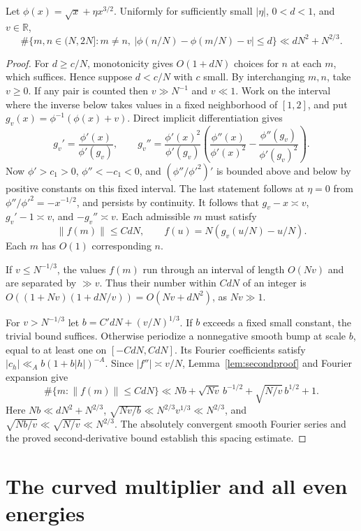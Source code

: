 \begin{lemma}\label{lem:spacingproof}
Let $\phi(x)=\sqrt x+\eta x^{3/2}$. Uniformly for sufficiently small
$|\eta|$, $0<d<1$, and $v\in\mathbb R$,
\[
 \#\{m,n\in(N,2N]:m\ne n,\ |\phi(n/N)-\phi(m/N)-v|\le d\}
 \ll dN^2+N^{2/3}.
\]
\end{lemma}
\begin{proof}
For $d\ge c/N$, monotonicity gives $O(1+dN)$ choices for $n$ at each
$m$, which suffices. Hence suppose $d<c/N$ with $c$ small.
By interchanging $m,n$, take $v\ge0$. If any pair is counted then
$v\gg N^{-1}$ and $v\ll1$. Work on the interval where the inverse below
takes values in a fixed neighborhood of $[1,2]$, and put
$g_v(x)=\phi^{-1}(\phi(x)+v)$. Direct implicit differentiation gives
\[
 g_v'=\frac{\phi'(x)}{\phi'(g_v)},\qquad
 g_v''=\frac{\phi'(x)^2}{\phi'(g_v)}
 \left(\frac{\phi''(x)}{\phi'(x)^2}
       -\frac{\phi''(g_v)}{\phi'(g_v)^2}\right).
\]
Now $\phi'>c_1>0$, $\phi''<-c_1<0$, and
$(\phi''/\phi'^2)'$ is bounded above and below by positive constants
on this fixed interval. The last statement follows at $\eta=0$ from
$\phi''/\phi'^2=-x^{-1/2}$, and persists by continuity.
It follows that $g_v-x\asymp v$, $g_v'-1\asymp v$, and
$-g_v''\asymp v$. Each admissible $m$ must satisfy
\[
 \|f(m)\|\le C dN,\qquad f(u)=N(g_v(u/N)-u/N).
\]
Each $m$ has $O(1)$ corresponding $n$.

If $v\le N^{-1/3}$, the values $f(m)$ run through an interval of length
$O(Nv)$ and are separated by $\gg v$. Thus their number within $CdN$
of an integer is $O((1+Nv)(1+dN/v))=O(Nv+dN^2)$, as $Nv\gg1$.

For $v>N^{-1/3}$ let $b=C'dN+(v/N)^{1/3}$.
If $b$ exceeds a fixed small constant, the trivial bound suffices.
Otherwise periodize a nonnegative smooth bump at scale $b$, equal to at
least one on $[-CdN,CdN]$. Its Fourier coefficients satisfy
$|c_h|\ll_A b(1+b|h|)^{-A}$. Since $|f''|\asymp v/N$,
Lemma~\ref{lem:secondproof} and Fourier expansion give
\[
 \#\{m:\|f(m)\|\le CdN\}
 \ll Nb+\sqrt{Nv}\,b^{-1/2}+\sqrt{N/v}\,b^{1/2}+1.
\]
Here $Nb\ll dN^2+N^{2/3}$,
$\sqrt{Nv/b}\ll N^{2/3}v^{1/3}\ll N^{2/3}$, and
$\sqrt{Nb/v}\ll\sqrt{N/v}\ll N^{2/3}$.
The absolutely convergent smooth Fourier series and the proved
second-derivative bound establish this spacing estimate.
\end{proof}

\section{The curved multiplier and all even energies}\label{app:energyproof}

